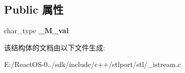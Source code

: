 \subsection*{Public 属性}
\begin{DoxyCompactItemize}
\item 
\mbox{\label{struct___scan__for__char__val_a977c4e39a6d9d3bf57f496db8bcab3eb}} 
char\+\_\+type {\bfseries \+\_\+\+M\+\_\+val}
\end{DoxyCompactItemize}


该结构体的文档由以下文件生成\+:\begin{DoxyCompactItemize}
\item 
E\+:/\+React\+O\+S-\/0../sdk/include/c++/stlport/stl/\+\_\+istream.\+c\end{DoxyCompactItemize}
